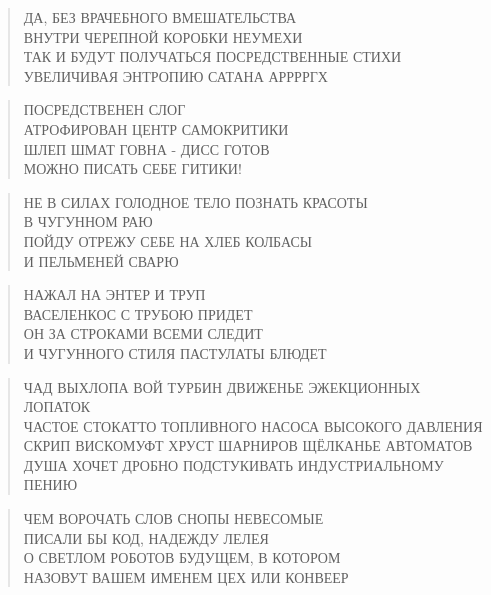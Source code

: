 \poemtitle{***}
\begin{verse}
ДА, БЕЗ ВРАЧЕБНОГО ВМЕШАТЕЛЬСТВА\\
ВНУТРИ ЧЕРЕПНОЙ КОРОБКИ НЕУМЕХИ\\
ТАК И БУДУТ ПОЛУЧАТЬСЯ ПОСРЕДСТВЕННЫЕ СТИХИ\\
УВЕЛИЧИВАЯ ЭНТРОПИЮ САТАНА АРРРРГХ
\end{verse}

\poemtitle{***}
\begin{verse}
ПОСРЕДСТВЕНЕН СЛОГ\\
АТРОФИРОВАН ЦЕНТР САМОКРИТИКИ\\
ШЛЕП ШМАТ ГОВНА - ДИСС ГОТОВ\\
МОЖНО ПИСАТЬ СЕБЕ ГИТИКИ!
\end{verse}

\poemtitle{***}
\begin{verse}
НЕ В СИЛАХ ГОЛОДНОЕ ТЕЛО ПОЗНАТЬ КРАСОТЫ\\
В ЧУГУННОМ РАЮ\\
ПОЙДУ ОТРЕЖУ СЕБЕ НА ХЛЕБ КОЛБАСЫ\\
И ПЕЛЬМЕНЕЙ СВАРЮ
\end{verse}

\poemtitle{***}
\begin{verse}
НАЖАЛ НА ЭНТЕР И ТРУП\\
ВАСЕЛЕНКОС С ТРУБОЮ ПРИДЕТ\\
ОН ЗА СТРОКАМИ ВСЕМИ СЛЕДИТ\\
И ЧУГУННОГО СТИЛЯ ПАСТУЛАТЫ БЛЮДЕТ
\end{verse}

\poemtitle{***}
\begin{verse}
ЧАД ВЫХЛОПА ВОЙ ТУРБИН ДВИЖЕНЬЕ ЭЖЕКЦИОННЫХ ЛОПАТОК\\
ЧАСТОЕ СТОКАТТО ТОПЛИВНОГО НАСОСА ВЫСОКОГО ДАВЛЕНИЯ\\
СКРИП ВИСКОМУФТ ХРУСТ ШАРНИРОВ ЩЁЛКАНЬЕ АВТОМАТОВ\\
ДУША ХОЧЕТ ДРОБНО ПОДСТУКИВАТЬ ИНДУСТРИАЛЬНОМУ ПЕНИЮ
\end{verse}

\poemtitle{***}
\begin{verse}
ЧЕМ ВОРОЧАТЬ СЛОВ СНОПЫ НЕВЕСОМЫЕ\\
ПИСАЛИ БЫ КОД, НАДЕЖДУ ЛЕЛЕЯ\\
О СВЕТЛОМ РОБОТОВ БУДУЩЕМ, В КОТОРОМ\\
НАЗОВУТ ВАШЕМ ИМЕНЕМ ЦЕХ ИЛИ КОНВЕЕР
\end{verse}

